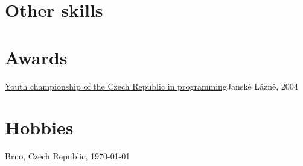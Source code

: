 \documentclass[11pt,a4paper]{moderncv}
\begin{document}
\section{Other skills}

\section{Awards}
    {\href{http://www.stv.cz/pgm_cr/mcr2004vm.html}{Youth championship of the
    Czech Republic in programming}}{Janské Lázně, 2004}{}{}

\section{Hobbies}
\renewcommand{\listitemsymbol}{\Neutral}

\renewcommand{\refname}{Publications, talks}
\makeatletter
\def\mybiblabel#1(#2){\hskip 0pt plus 1filll\relax #2}
\def\@biblabel#1{\mybiblabel #1}
\makeatother
\nocite{*}



\vfill
Brno, Czech Republic, \today
\end{document}
